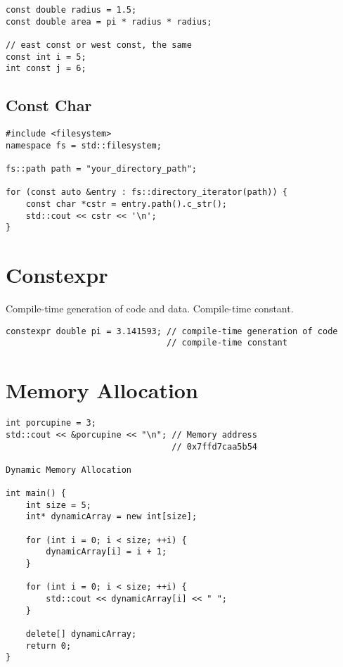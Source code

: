 \begin{verbatim}
const double radius = 1.5;
const double area = pi * radius * radius;

// east const or west const, the same
const int i = 5;
int const j = 6;
\end{verbatim}

\subsection{Const Char}

\begin{verbatim}
#include <filesystem>
namespace fs = std::filesystem;

fs::path path = "your_directory_path";

for (const auto &entry : fs::directory_iterator(path)) {
    const char *cstr = entry.path().c_str();
    std::cout << cstr << '\n';
}
\end{verbatim}

\section{Constexpr}

Compile-time generation of code and data. Compile-time constant.

\begin{verbatim}
constexpr double pi = 3.141593; // compile-time generation of code
                                // compile-time constant
\end{verbatim}

\section{Memory Allocation}

\begin{verbatim}
int porcupine = 3;
std::cout << &porcupine << "\n"; // Memory address
                                 // 0x7ffd7caa5b54

Dynamic Memory Allocation

int main() {
    int size = 5;
    int* dynamicArray = new int[size];

    for (int i = 0; i < size; ++i) {
        dynamicArray[i] = i + 1;
    }

    for (int i = 0; i < size; ++i) {
        std::cout << dynamicArray[i] << " ";
    }

    delete[] dynamicArray;
    return 0;
}
\end{verbatim}

